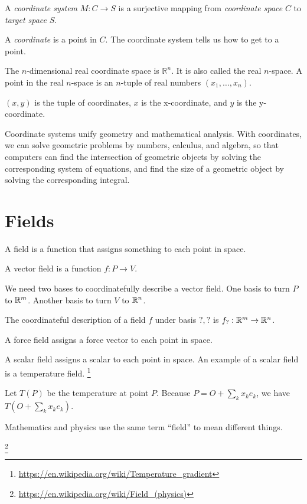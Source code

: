 
A \emph{coordinate system} $M : C \to S$ is a surjective mapping from
\emph{coordinate space} $C$ to \emph{target space} $S$.

A \emph{coordinate} is a point in \(C\).
The coordinate system tells us how to get to a point.

The \(n\)-dimensional real coordinate space is $\mathbb{R}^n$.
It is also called the real $n$-space.
A point in the real $n$-space is an $n$-tuple of real numbers $(x_1,\ldots,x_n)$.

$(x,y)$ is the tuple of coordinates,
$x$ is the x-coordinate, and $y$ is the y-coordinate.

Coordinate systems unify geometry and
mathematical analysis.
With coordinates,
we can solve geometric problems by
numbers, calculus, and algebra,
so that computers can
find the intersection of geometric objects
by solving the corresponding system of equations,
and find the size of a geometric object by solving the corresponding integral.

\section{Fields}

A field is a function that assigns something to each point in space.

A vector field is a function \( f : P \to V \).

We need two bases to coordinatefully describe a vector field.
One basis to turn \( P \) to \(\mathbb{R}^m\).
Another basis to turn \(V\) to \(\mathbb{R}^n\).

The coordinateful description of a field \(f\) under basis \(?,?\) is \(f_? : \mathbb{R}^m \to \mathbb{R}^n\).

A force field assigns a force vector to each point in space.

A scalar field assigns a scalar to each point in space.
An example of a scalar field is a temperature field.%
\footnote{\url{https://en.wikipedia.org/wiki/Temperature_gradient}}

Let \(T(P)\) be the temperature at point \(P\).
Because \(P = O + \sum_k x_k e_k\), we have \(T(O + \sum_k x_k e_k)\).

Mathematics and physics use the same term \enquote{field} to mean different things.

\footnote{\url{https://en.wikipedia.org/wiki/Field_(physics)}}
